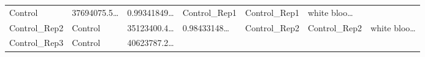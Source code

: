 \documentclass[
]{article}
\begin{document}
\begin{longtable}[]{@{}lllllll@{}}
\begin{minipage}[t]{0.07\columnwidth}
Control\strut
\end{minipage} & \begin{minipage}[t]{0.13\columnwidth}\raggedright
37694075.5\ldots{}\strut
\end{minipage} & \begin{minipage}[t]{0.13\columnwidth}\raggedright
0.99341849\ldots{}\strut
\end{minipage} & \begin{minipage}[t]{0.12\columnwidth}\raggedright
Control\_Rep1\strut
\end{minipage} & \begin{minipage}[t]{0.12\columnwidth}\raggedright
Control\_Rep1\strut
\end{minipage} & \begin{minipage}[t]{0.13\columnwidth}\raggedright
white bloo\ldots{}\strut
\end{minipage}\tabularnewline
\begin{minipage}[t]{0.12\columnwidth}\raggedright
Control\_Rep2\strut
\end{minipage} & \begin{minipage}[t]{0.07\columnwidth}\raggedright
Control\strut
\end{minipage} & \begin{minipage}[t]{0.13\columnwidth}\raggedright
35123400.4\ldots{}\strut
\end{minipage} & \begin{minipage}[t]{0.13\columnwidth}\raggedright
0.98433148\ldots{}\strut
\end{minipage} & \begin{minipage}[t]{0.12\columnwidth}\raggedright
Control\_Rep2\strut
\end{minipage} & \begin{minipage}[t]{0.12\columnwidth}\raggedright
Control\_Rep2\strut
\end{minipage} & \begin{minipage}[t]{0.13\columnwidth}\raggedright
white bloo\ldots{}\strut
\end{minipage}\tabularnewline
\begin{minipage}[t]{0.12\columnwidth}\raggedright
Control\_Rep3\strut
\end{minipage} & \begin{minipage}[t]{0.07\columnwidth}\raggedright
Control\strut
\end{minipage} & \begin{minipage}[t]{0.13\columnwidth}\raggedright
40623787.2\ldots{}\strut
\end{minipage} & \begin{minipage}[t]{0.13\columnwidth}\raggedright

\end{minipage}
\end{longtable}
\end{document}

